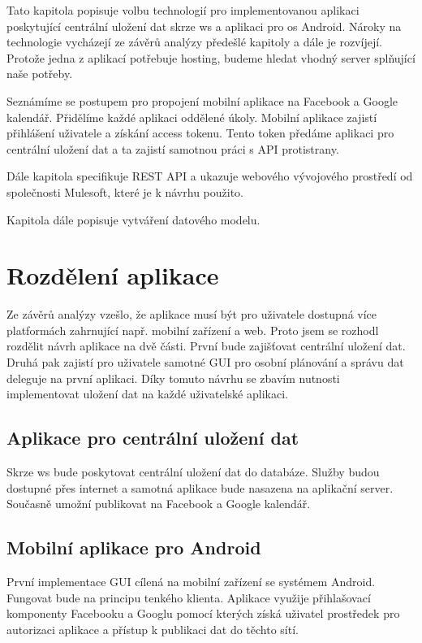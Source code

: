 \documentclass[thesis=B,czech]{FITthesis}[2012/06/26]
\begin{document}
Tato kapitola popisuje volbu technologií pro implementovanou aplikaci poskytující centrální uložení dat skrze \acrshort{ws} a aplikaci pro \acrshort{os} Android. Nároky na technologie vycházejí ze závěrů analýzy předešlé kapitoly a dále je rozvíjejí.
Protože jedna z aplikací potřebuje hosting, budeme hledat vhodný server splňující naše potřeby.

Seznámíme se postupem pro propojení mobilní aplikace na Facebook a Google kalendář. Přidělíme každé aplikaci oddělené úkoly. Mobilní aplikace zajistí přihlášení uživatele a získání access tokenu. Tento token předáme aplikaci pro centrální uložení dat a ta zajistí samotnou práci s API protistrany.

Dále kapitola specifikuje REST API a ukazuje webového vývojového prostředí od společnosti Mulesoft, které je k návrhu použito. 

Kapitola dále popisuje vytváření datového modelu.

\section{Rozdělení aplikace}

Ze závěrů analýzy vzešlo, že aplikace musí být pro uživatele dostupná více platformách zahrnující např. mobilní zařízení a web. Proto jsem se rozhodl rozdělit návrh aplikace na dvě části. První bude zajišťovat centrální uložení dat. Druhá pak zajistí pro uživatele samotné GUI pro osobní plánování a správu dat deleguje na první aplikaci. Díky tomuto návrhu se zbavím nutnosti implementovat uložení dat na každé uživatelské aplikaci.

\subsection{Aplikace pro centrální uložení dat}

Skrze \acrshort{ws} bude poskytovat centrální uložení dat do databáze. Služby budou dostupné přes internet a samotná aplikace bude nasazena na aplikační server. Současně umožní publikovat na Facebook a Google kalendář. 

\subsection{Mobilní aplikace pro Android}

První implementace GUI cílená na mobilní zařízení se systémem Android. Fungovat bude na  principu tenkého klienta\cite{gtd_thin_client}. Aplikace využije přihlašovací komponenty Facebooku a Googlu pomocí kterých získá uživatel prostředek pro autorizaci aplikace a přístup k publikaci dat do těchto sítí.
\end{document}
